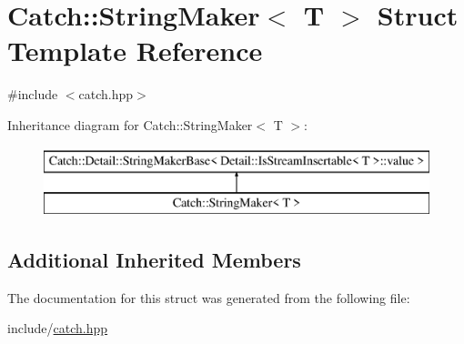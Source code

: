 \hypertarget{struct_catch_1_1_string_maker}{}\section{Catch\+:\+:String\+Maker$<$ T $>$ Struct Template Reference}
\label{struct_catch_1_1_string_maker}


{\ttfamily \#include $<$catch.\+hpp$>$}

Inheritance diagram for Catch\+:\+:String\+Maker$<$ T $>$\+:\begin{figure}[H]
\begin{center}
\leavevmode
\includegraphics[height=2.000000cm]{struct_catch_1_1_string_maker}
\end{center}
\end{figure}
\subsection*{Additional Inherited Members}


The documentation for this struct was generated from the following file\+:\begin{DoxyCompactItemize}
\item 
include/\mbox{\hyperlink{catch_8hpp}{catch.\+hpp}}\end{DoxyCompactItemize}
